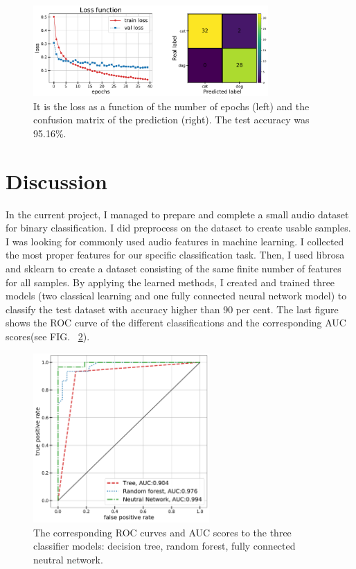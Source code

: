 \documentclass[12pt a4paper]{article}
\numberwithin{equation}{section}
\begin{document}
\begin{figure}[H]
\centering
\includegraphics[width=0.8\textwidth]{fig/conf2.pdf}
\caption{It is the loss as a function of the number of epochs (left) and the confusion matrix of the prediction (right). The test accuracy was 95.16\%.}
\label{fig9}
\end{figure}

\section{Discussion}
In the current project, I managed to prepare and complete a small audio dataset for binary classification. I did preprocess on the dataset to create usable samples. I was looking for commonly used audio features in machine learning. I collected the most proper features for our specific classification task. Then, I used librosa and sklearn to create a dataset consisting of the same finite number of features for all samples.  By applying the learned methods, I created and trained three models (two classical learning and one fully connected neural network model) to classify the test dataset with accuracy higher than 90 per cent. The last figure shows the ROC curve of the different classifications and the corresponding AUC scores(see FIG. ~\ref{fig10}).

\begin{figure}[H]
\centering
\includegraphics[width=0.6\textwidth]{fig/ROC.pdf}
\caption{The corresponding ROC curves and AUC scores to the three classifier models: decision tree, random forest, fully connected neutral network.}
\label{fig10}
\end{figure}
\end{document}

